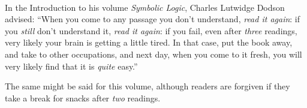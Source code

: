 \thispagestyle{empty}
\onecolumn
\ 
\vfill

\parbox{3 in}{
In the Introduction to his volume \emph{Symbolic Logic}, Charles Lutwidge Dodson advised: ``When you come to any passage you don't understand, \emph{read it again}: if you \emph{still} don't understand it, \emph{read it again}: if you fail, even after \emph{three} readings, very likely your brain is getting a little tired. In that case, put the book away, and take to other occupations, and next day, when you come to it fresh, you will very likely find that it is \emph{quite} easy.''

\medskip

The same might be said for this volume, although readers are forgiven if they take a break for snacks after \emph{two} readings.
}

\vfill

\parbox{3 in}{

}
\vfill
